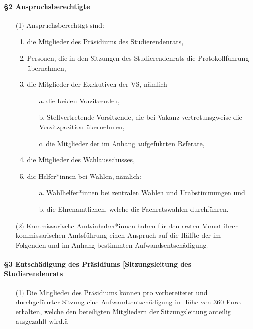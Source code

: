         \paragraph{§2 Anspruchsberechtigte}
            \begin{itemize}
                \item[(1)] Anspruchsberechtigt sind:
                    \begin{enumerate}
                        \item   die Mitglieder des Präsidiums des Studierendenrats, 
                        \item  Personen, die in den Sitzungen des Studierendenrats die Protokollführung übernehmen,  
                        \item  die Mitglieder der Exekutiven der VS, nämlich 
                            \begin{itemize}
                                \item[a.] die beiden Vorsitzenden, 
                                \item[b.] Stellvertretende Vorsitzende, die bei Vakanz vertretunsgweise die Vorsitzposition übernehmen,
                                \item[c.] die Mitglieder der im Anhang aufgeführten Referate, 
                            \end{itemize}
                        \item  die Mitglieder des Wahlausschusses, 
                        \item   die Helfer*innen bei Wahlen, nämlich:
                            \begin{itemize}
                                \item[a.] Wahlhelfer*innen bei zentralen Wahlen und Urabstimmungen und
                                \item[b.] die Ehrenamtlichen, welche die Fachratswahlen durchführen.
                            \end{itemize}
                    \end{enumerate} 
                \item[(2)]  Kommissarische Amtsinhaber*innen haben für den ersten Monat ihrer kommissarischen Amtsführung einen Anspruch auf die Hälfte der im Folgenden und im Anhang bestimmten Aufwandsentschädigung.
            \end{itemize}
        \paragraph{§3 Entschädigung des Präsidiums  [Sitzungsleitung des Studierendenrats]}
            \begin{itemize}
                \item[(1)]  Die Mitglieder des Präsidiums können pro vorbereiteter und durchgeführter Sitzung eine Aufwandsentschädigung in Höhe von 360 Euro erhalten, welche den beteiligten Mitgliedern der Sitzungsleitung anteilig ausgezahlt wird.ä 
            \end{itemize}
